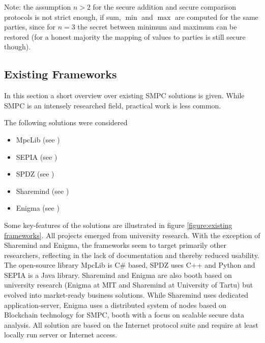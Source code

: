 Note: the assumption $n>2$ for the secure addition and secure comparison protocols is not strict enough, if sum, $\min$ and $\max$ are computed for the same parties, since for $n=3$ the secret between minimum and maximum can be restored (for a honest majority the mapping of values to parties is still secure though).

\subsection{Existing Frameworks} \label{Existing Frameworks}

In this section a short overview over existing \gls{SMPC} solutions is given. While \gls{SMPC} is an intensely researched field, practical work is less common.

The following solutions were considered

\begin{itemize}
	\item MpcLib (see \textcite{Online:MpcLib})
	\item SEPIA (see \textcite{Online:Sepia})
	\item SPDZ (see \textcite{Online:SPDZ})
	\item Sharemind (see \textcite{Online:Sharemind})
	\item Enigma (see \textcite{Online:Enigma})
\end{itemize}

Some key-features of the solutions are illustrated in figure \ref{figure:existing frameworks}. All projects emerged from university research. With the exception of Sharemind and Enigma, the frameworks seem to target primarily other researchers, reflecting in the lack of documentation and thereby reduced usability. The open-source library MpcLib is C\# based, SPDZ uses C++ and Python and SEPIA is a Java library.  Sharemind and Enigma are also booth based on university research (Enigma at MIT and Sharemind at University of Tartu) but evolved into market-ready business solutions. While Sharemind uses dedicated application-server, Enigma uses a distributed system of nodes based on Blockchain technology for \gls{SMPC}, booth with a focus on scalable secure data analysis.
All solution are based on the Internet protocol suite and require at least locally run server or Internet access.

